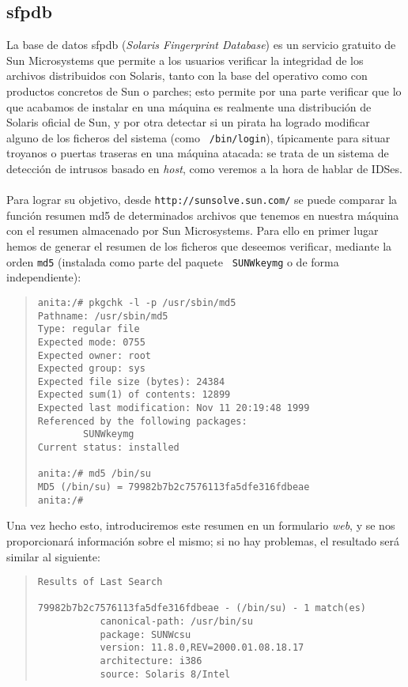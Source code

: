 \subsection{sfp{\sc db}}
La base de datos sfp{\sc db} ({\it Solaris Fingerprint Database}) es un 
servicio gratuito de Sun Microsystems que permite a los usuarios verificar la 
integridad de los archivos distribuidos con Solaris, tanto con la base del 
operativo como con productos concretos de Sun o parches; esto permite por una
parte verificar que lo que acabamos de instalar en una m\'aquina es realmente
una distribuci\'on de Solaris oficial de Sun, y por otra detectar si un 
pirata ha logrado modificar alguno de los ficheros del sistema (como {\tt
/bin/login}), t\'{\i}picamente para situar troyanos o puertas traseras en una
m\'aquina atacada: se trata de un sistema de detecci\'on de intrusos basado en
{\it host}, como veremos a la hora de hablar de IDSes.\\
\\Para lograr su objetivo, desde {\tt http://sunsolve.sun.com/} se puede 
comparar la funci\'on resumen {\sc md5} de determinados archivos que tenemos
en nuestra m\'aquina con el resumen almacenado por Sun Microsystems. Para ello
en primer lugar hemos de generar el resumen de los ficheros que deseemos 
verificar, mediante la orden {\tt md5} (instalada como parte del paquete {\tt
SUNWkeymg} o de forma independiente):
\begin{quote}
\begin{verbatim}
anita:/# pkgchk -l -p /usr/sbin/md5
Pathname: /usr/sbin/md5
Type: regular file
Expected mode: 0755
Expected owner: root
Expected group: sys
Expected file size (bytes): 24384
Expected sum(1) of contents: 12899
Expected last modification: Nov 11 20:19:48 1999
Referenced by the following packages:
        SUNWkeymg      
Current status: installed

anita:/# md5 /bin/su
MD5 (/bin/su) = 79982b7b2c7576113fa5dfe316fdbeae
anita:/# 
\end{verbatim}
\end{quote}
Una vez hecho esto, introduciremos este resumen en un formulario {\it web}, y 
se nos proporcionar\'a informaci\'on sobre el mismo; si no hay problemas, el
resultado ser\'a similar al siguiente:
\begin{quote}
\begin{verbatim}
Results of Last Search

79982b7b2c7576113fa5dfe316fdbeae - (/bin/su) - 1 match(es) 
           canonical-path: /usr/bin/su 
           package: SUNWcsu 
           version: 11.8.0,REV=2000.01.08.18.17 
           architecture: i386 
           source: Solaris 8/Intel 
\end{verbatim}
\end{quote}
